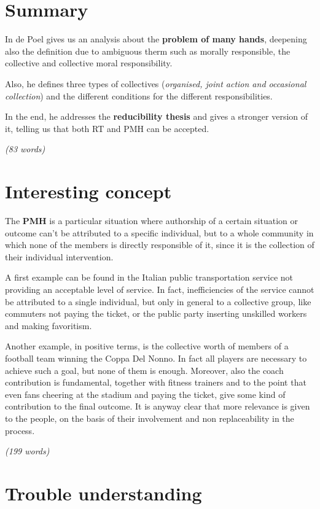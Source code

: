 \section{Summary}
In \cite{p2} de Poel gives us an analysis about the \textbf{problem of many hands}, deepening also the definition due to ambiguous therm such as morally responsible, the collective and collective moral responsibility.

Also, he defines three types of collectives (\textit{organised, joint action and occasional collection}) and the different conditions for the different responsibilities.

In the end, he addresses the \textbf{reducibility thesis} and gives a stronger version of it, telling us that both RT and PMH can be accepted.

\emph{(83 words)}

\section{Interesting concept}
The \textbf{PMH} is a particular situation where authorship of a certain situation or outcome can't be attributed to a specific individual, but to a whole community in which none of the members is directly responsible of it, since it is the collection of their individual intervention.

A first example can be found in the Italian public transportation service not providing an acceptable level of service. In fact, inefficiencies of the service cannot be attributed to a single individual, but only in general to a collective group, like commuters not paying the ticket, or the public party inserting unskilled workers and making favoritism.

Another example, in positive terms, is the collective worth of members of a football team winning the Coppa Del Nonno. In fact all players are necessary to achieve such a goal, but none of them is enough. Moreover, also the coach contribution is fundamental, together with fitness trainers and to the point that even fans cheering at the stadium and paying the ticket, give some kind of contribution to the final outcome. It is anyway clear that more relevance is given to the people, on the basis of their involvement and non replaceability in the process.

\emph{(199 words)}

\section{Trouble understanding}
